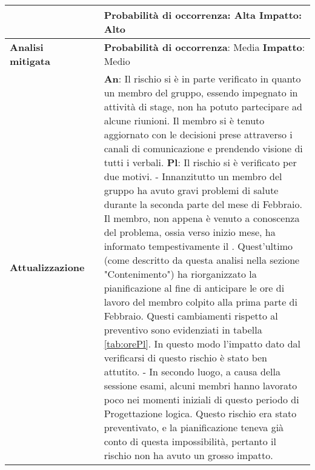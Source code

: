 \begin{table}[H]
\begin{center}
{\begin{tabular}{p{2.5cm}p{0.5cm}p{11cm}}
				& &
				\textbf{Probabilità di occorrenza}: Alta
				\newline
				\textbf{Impatto}: Alto
				\\
				\midrule
				\textbf{Analisi \newline mitigata}
				& &
				\textbf{Probabilità di occorrenza}: Media
				\newline
				\textbf{Impatto}: Medio
				\\
				\midrule
				\textbf{Attualizzazione}
				& &
				\textbf{An}: Il rischio si è in parte verificato in quanto un membro del gruppo, essendo impegnato in attività di stage, non ha potuto partecipare ad alcune riunioni. Il membro si è tenuto aggiornato con le decisioni prese attraverso i canali di comunicazione e prendendo visione di tutti i verbali.
				\newline
				\textbf{Pl}: Il rischio si è verificato per due motivi.
				- Innanzitutto un membro del gruppo ha avuto gravi problemi di salute durante la seconda parte del mese di Febbraio. Il membro, non appena è venuto a conoscenza del problema, ossia verso inizio mese, ha informato tempestivamente il \responsabile. Quest'ultimo (come descritto da questa analisi nella sezione "Contenimento") ha riorganizzato la pianificazione al fine di anticipare le ore di lavoro del membro colpito alla prima parte di Febbraio. Questi cambiamenti 
				rispetto al preventivo sono evidenziati in tabella \ref{tab:orePl}. In questo modo l'impatto dato dal verificarsi di questo rischio è stato ben attutito.
				- In secondo luogo, a causa della sessione esami, alcuni membri hanno lavorato poco nei momenti iniziali di questo periodo di Progettazione logica. Questo rischio era stato preventivato, e la pianificazione teneva già conto di questa impossibilità, pertanto il rischio non ha avuto un grosso impatto.
				\\
				\bottomrule	
			\end{tabular}}
		\end{center}
	\end{table}			
	
